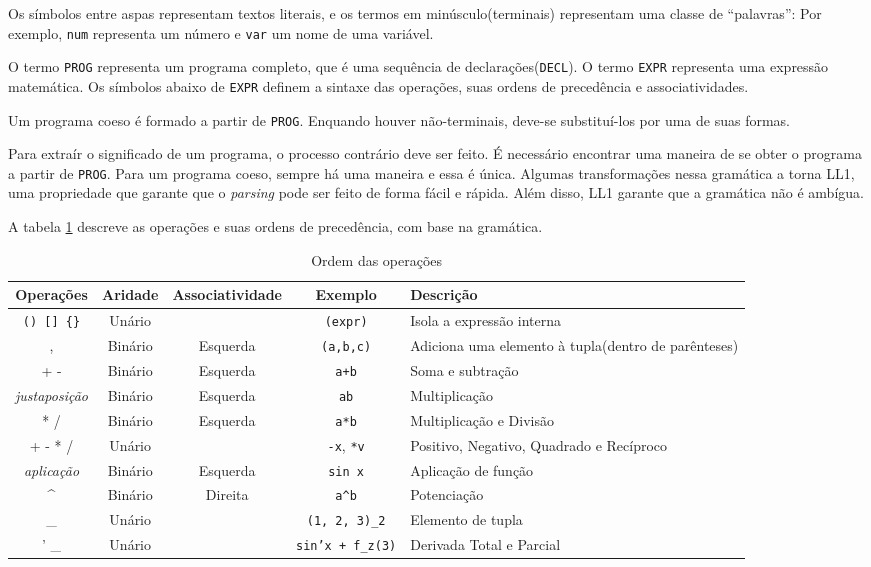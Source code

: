 Os símbolos entre aspas representam textos literais,
e os termos em minúsculo(terminais) representam uma classe de ``palavras'':
Por exemplo, \texttt{num} representa um número e \texttt{var} um nome de uma variável.

O termo \texttt{PROG} representa um programa completo,
que é uma sequência de declarações(\texttt{DECL}).
O termo \texttt{EXPR} representa uma expressão matemática.
Os símbolos abaixo de \texttt{EXPR} definem a sintaxe das operações,
suas ordens de precedência e associatividades.

Um programa coeso é formado a partir de \texttt{PROG}.
Enquando houver não-terminais, deve-se substituí-los por uma de suas formas.

Para extraír o significado de um programa, o processo contrário deve ser feito. 
É necessário encontrar uma maneira de se obter o programa a partir de \texttt{PROG}.
Para um programa coeso, sempre há uma maneira e essa é única.
Algumas transformações nessa gramática a torna LL1,
uma propriedade que garante que o \textit{parsing} pode ser feito de forma fácil e rápida.
Além disso, LL1 garante que a gramática não é ambígua. \cite{GramCheck}

A tabela \ref{order} descreve as operações e suas ordens de precedência, com base na gramática.

\begin{table}[ht]
\caption{Ordem das operações}
\label{order}
\begin{centering}
\begin{tabularx}{\textwidth}{||c|c|c|c|X||}
    \cline{1-5}
    Operações & Aridade & Associatividade & Exemplo & Descrição \\ \hline \hline

    \texttt{() [] \{\}} & Unário &  & \texttt{(expr)} & Isola a expressão interna \\ \hline
    , & Binário & Esquerda & \texttt{(a,b,c)} & Adiciona uma elemento à tupla(dentro de parênteses) \\ \hline
    + - & Binário & Esquerda & \texttt{a+b} & Soma e subtração \\ \hline
    \textit{justaposição} & Binário & Esquerda & \texttt{ab} & Multiplicação \\ \hline
    * / & Binário & Esquerda & \texttt{a*b} & Multiplicação e Divisão \\ \hline
    + - * / & Unário &  & \texttt{-x}, \texttt{*v} & Positivo, Negativo, Quadrado e Recíproco \\ \hline
    \textit{aplicação} & Binário & Esquerda & \texttt{sin x} & Aplicação de função \\ \hline
    \textasciicircum & Binário & Direita & \texttt{a\textasciicircum b} & Potenciação \\ \hline
    \_ & Unário & & \texttt{(1, 2, 3)\_2} & Elemento de tupla \\ \hline
    ' \_ & Unário & & \texttt{sin'x + f\_z(3)} & Derivada Total e Parcial \\ \hline
    \cline{1-5}
\end{tabularx}
\end{centering}
\end{table}


